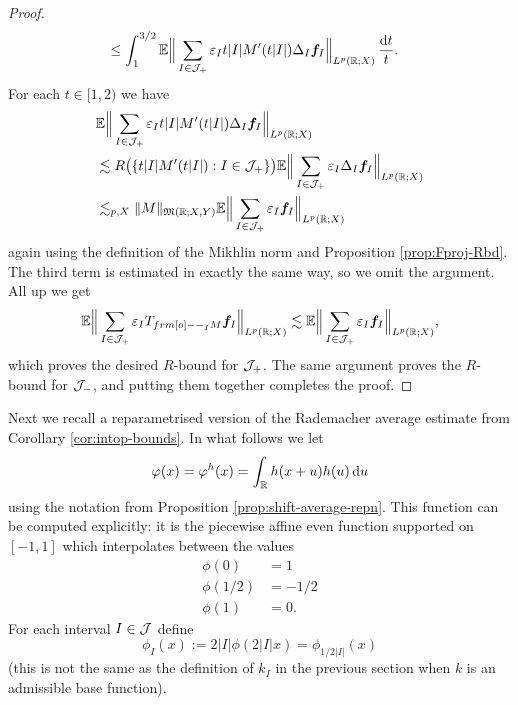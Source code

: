 \begin{proof}
\begin{equation*}
\begin{aligned}
    &\leq \int_{1}^{3/2} \mathbb{E} \Big\| \sum_{I \in \mathcal{J}_{+}} \varepsilon_{I} t|I|  M'(t|I|)\Delta_{I} \bm{f}_{I} \Big\|_{L^p(\mathbb{R};X)} \, \frac{\mathrm{d} t}{t}.
  \end{aligned}
\end{equation*}
For each $t \in [1,2)$ we have
\begin{equation*}
  \begin{aligned}
    &\mathbb{E} \Big\| \sum_{I \in \mathcal{J}_{+}} \varepsilon_{I} t|I|  M'(t|I|)\Delta_{I} \bm{f}_{I} \Big\|_{L^p(\mathbb{R};X)} \\
    &\lesssim R\big( \{ t|I|  M'(t|I|) : I \in \mathcal{J}_{+}\} \big) \mathbb{E} \Big\| \sum_{I \in \mathcal{J}_{+}} \varepsilon_{I} \Delta_{I} \bm{f}_{I} \Big\|_{L^p(\mathbb{R};X)} \\
    &\lesssim_{p,X} \|M\|_{\mathfrak{M}(\mathbb{R};X,Y)} \mathbb{E} \Big\| \sum_{I \in \mathcal{J}_{+}} \varepsilon_{I} \bm{f}_{I} \Big\|_{L^p(\mathbb{R};X)}
  \end{aligned}
\end{equation*}
again using the definition of the Mikhlin norm and Proposition \ref{prop:Fproj-Rbd}.
The third term is estimated in exactly the same way, so we omit the argument.
All up we get
\begin{equation*}
  \begin{aligned}
    \E \Big\| \sum_{I \in \mc{J}_{+}} \varepsilon_{I} T_{\1_{I} M} \mb{f}_{I} \Big\|_{L^p(\R;X)} \lesssim \E \Big\|\sum_{I \in \mc{J}_{+}} \varepsilon_{I} \mb{f}_{I} \Big\|_{L^p(\R;X)},
  \end{aligned}
\end{equation*}
which proves the desired $R$-bound for $\mathcal{J}_{+}$.
The same argument proves the $R$-bound for $\mathcal{J}_{-}$, and putting them together completes the proof.
\end{proof}

Next we recall a reparametrised version of the Rademacher average estimate from Corollary \ref{cor:intop-bounds}.
In what follows we let
\begin{equation*}
  \varphi(x) = \varphi^{h}(x) = \int_{\mathbb{R}} h(x+u) h(u) \, \mathrm{d} u
\end{equation*}
using the notation from Proposition \ref{prop:shift-average-repn}.
This function can be computed explicitly: it is the piecewise affine even function supported on $[-1,1]$ which interpolates between the values
\begin{equation*}
  \begin{aligned}
    \phi(0) &= 1 \\ 
    \phi(1/2) &= -1/2 \\
    \phi(1) &= 0.
  \end{aligned}
\end{equation*}
For each interval $I \in \mathcal{J}$ define
\begin{equation*}
  \phi_{I}(x) := 2|I|\phi(2|I|x) = \phi_{1/2|I|}(x)
\end{equation*}
(this is not the same as the definition of $k_{I}$ in the previous section when $k$ is an admissible base function).

